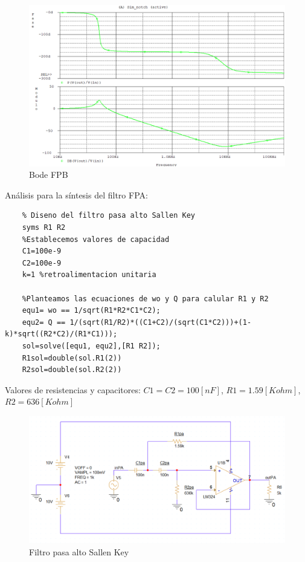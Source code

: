 \documentclass[12pt]{article}
\begin{document}
	\begin{figure}
		\includegraphics[width=1\linewidth]{Imagenes/Bode_FPB}
		\caption[Bode FPB]{Bode FPB}
		\label{fig:bodefpb}
	\end{figure}\newpage
	
	Análisis para la síntesis del filtro FPA:
	\begin{lstlisting}
	% Diseno del filtro pasa alto Sallen Key
	syms R1 R2
	%Establecemos valores de capacidad
	C1=100e-9
	C2=100e-9
	k=1 %retroalimentacion unitaria
	
	%Planteamos las ecuaciones de wo y Q para calular R1 y R2
	equ1= wo == 1/sqrt(R1*R2*C1*C2);
	equ2= Q == 1/(sqrt(R1/R2)*((C1+C2)/(sqrt(C1*C2)))+(1-k)*sqrt((R2*C2)/(R1*C1)));
	sol=solve([equ1, equ2],[R1 R2]);
	R1sol=double(sol.R1(2))
	R2sol=double(sol.R2(2))	
	\end{lstlisting}
	
	Valores de resistencias y capacitores: $C1=C2=100[nF]$, $R1=1.59[Kohm]$, $R2=636[Kohm]$ \newpage
	\begin{figure}[h!]
		\includegraphics[width=1\linewidth]{Imagenes/FPA}
		\caption[Filtro pasa alto Sallen Key]{Filtro pasa alto Sallen Key}
		\label{fig:fpa}
	\end{figure}
	
\end{document}
